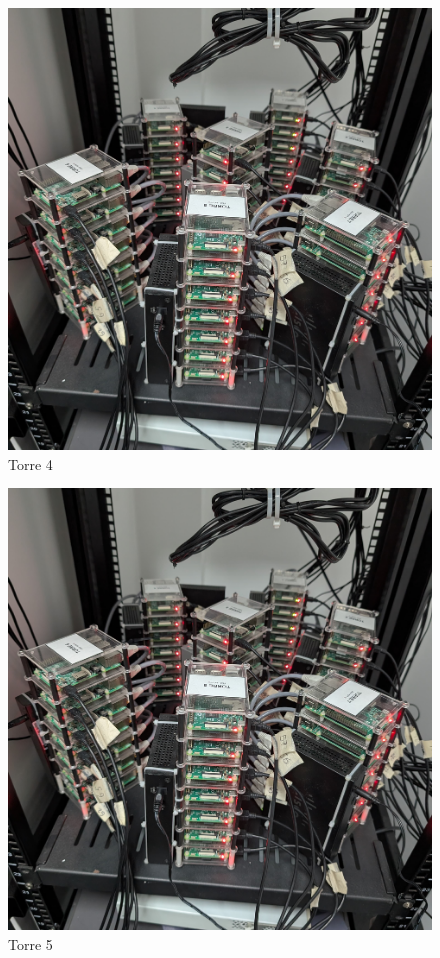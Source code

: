 \hbox{}
\hbox{}
\hbox{}
\hbox{}

\begin{figure}[H]
	\centering
	\includegraphics[scale=0.07]{tablas-images/raspberries/torre-04.jpg}
	\caption{Torre 4}
\end{figure}



\begin{figure}[H]
	\centering
	\includegraphics[scale=0.07]{tablas-images/raspberries/torre-05.jpg}
	\caption{Torre 5}
\end{figure}


